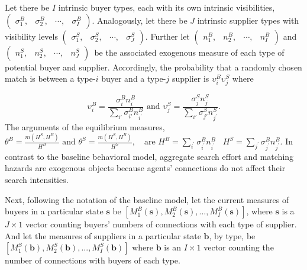 \documentclass[12pt]{article} \usepackage{amsmath,amssymb,amsthm,geometry,graphicx,setspace,algorithm,algpseudocode,float}
\begin{document}
Let there be $I$ intrinsic buyer types, each with its own intrinsic
visibilities, $\left(\begin{array}{cccc}
\sigma_{1}^{B}, & \sigma_{2}^{B}, & \cdots, & \sigma_{I}^{B}\end{array}\right).$ Analogously, let there be $J$ intrinsic supplier types with visibility
levels $\left(\begin{array}{cccc}
\sigma_{1}^{S}, & \sigma_{2}^{S}, & \cdots, & \sigma_{J}^{S}\end{array}\right).$ Further let $\left(\begin{array}{cccc}
n_{1}^{B}, & n_{2}^{B}, & \cdots, & n_{I}^{B}\end{array}\right)$ and $\left(\begin{array}{cccc}
n_{1}^{S}, & n_{2}^{S}, & \cdots, & n_{J}^{S}\end{array}\right)$\ be the associated exogenous measure of each type of potential buyer
and supplier. Accordingly, the probability that a randomly chosen match
is between a type-$i$ buyer and a type-$j$ supplier is $\upsilon_{i}^{B}\upsilon_{j}^{S}$
where

\[
\upsilon_{i}^{B}=\frac{\sigma_{i}^{B}n_{i}^{B}}{{\displaystyle \sum_{i'}}\sigma_{i'}^{B}n_{i^{\prime}}^{B}}\text{ and }\upsilon_{j}^{S}=\frac{\sigma_{j}^{S}n_{j}^{S}}{{\displaystyle \sum_{i'}}\sigma_{j'}^{S}n_{j^{\prime}}^{S}}.
\]
The arguments of the equilibrium measures,
$
\theta^{B}=\frac{m(H^{S},H^{B})}{H^{B}}\text{ and }\theta^{S}=\frac{m(H^{S},H^{B})}{H^{S}},\text{ }
$
are $H^{B}={\displaystyle \sum\limits _{i^{\prime}}}\sigma_{i^{\prime}}^{B}n_{i^{\prime}}^{B}$ \ $H^{S}={\displaystyle \sum\limits _{j^{\prime}}}\sigma_{j^{\prime}}^{B}n_{j^{\prime}}^{B}$. In contrast to the baseline behavioral model, aggregate search effort and matching hazards are exogenous objects
because agents' connections do not affect their search intensities.

Next, following the notation of the baseline model, let the current measures of buyers in a
particular state $\mathbf{s}$ be $\left[M_{1}^{B}(\mathbf{s}),M_{2}^{B}(\mathbf{s}),...,M_{I}^{B}(\mathbf{s})\right]$,
where $\mathbf{s}$ is a $J\times1$ vector counting buyers' numbers
of connections with each type of supplier. And let the measures of suppliers in a particular state $\mathbf{b}$, by type, be $\left[M_{1}^{S}(\mathbf{b}),M_{2}^{S}(\mathbf{b}),...,M_{I}^{S}(\mathbf{b})\right]$
where $\mathbf{b}$ is an $I\times1$ vector counting the number of
connections with buyers of each type.
\end{document}
